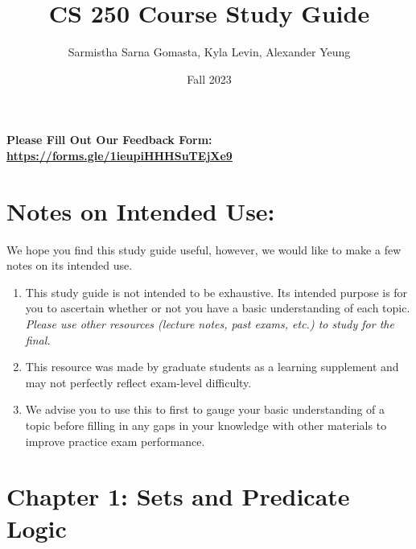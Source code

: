 \documentclass{article}
\title{CS 250 Course Study Guide}
\author{Sarmistha Sarna Gomasta, Kyla Levin, Alexander Yeung}
\date{Fall 2023}
\begin{document}
\maketitle
\begin{center}
    \textbf{Please Fill Out Our Feedback Form: \href{https://forms.gle/1ieupiHHHSuTEjXe9}{https://forms.gle/1ieupiHHHSuTEjXe9}}
\end{center}
\section*{Notes on Intended Use:}
We hope you find this study guide useful, however, we would like to make a few notes on its intended use. 
\begin{center}
    \begin{enumerate}
        \item This study guide is not intended to be exhaustive. Its intended purpose is for you to ascertain whether or not you have a basic understanding of each topic. \textit{Please use other resources (lecture notes, past exams, etc.) to study for the final.}
        \item This resource was made by graduate students as a learning supplement and may not perfectly reflect exam-level difficulty.
        \item We advise you to use this to first to gauge your basic understanding of a topic before filling in any gaps in your knowledge with other materials to improve practice exam performance.
    \end{enumerate}
    
\end{center}

\tableofcontents
\newpage



\section*{Chapter 1: Sets and Predicate Logic}
\end{document}
